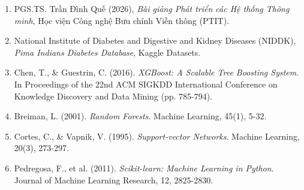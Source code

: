\documentclass[12pt,a4paper]{report}
\begin{document}
\begin{enumerate}[leftmargin=2em]
    \item PGS.TS. Trần Đình Quế (2026), \textit{Bài giảng Phát triển các Hệ thống Thông minh}, Học viện Công nghệ Bưu chính Viễn thông (PTIT).
    \item National Institute of Diabetes and Digestive and Kidney Diseases (NIDDK), \textit{Pima Indians Diabetes Database}, Kaggle Datasets.
    \item Chen, T., \& Guestrin, C. (2016). \textit{XGBoost: A Scalable Tree Boosting System}. In Proceedings of the 22nd ACM SIGKDD International Conference on Knowledge Discovery and Data Mining (pp. 785-794).
    \item Breiman, L. (2001). \textit{Random Forests}. Machine Learning, 45(1), 5-32.
    \item Cortes, C., \& Vapnik, V. (1995). \textit{Support-vector Networks}. Machine Learning, 20(3), 273-297.
    \item Pedregosa, F., et al. (2011). \textit{Scikit-learn: Machine Learning in Python}. Journal of Machine Learning Research, 12, 2825-2830.
\end{enumerate}
\end{document}
